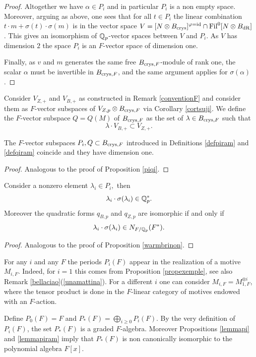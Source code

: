 \begin{proof}
 Altogether we have    $\alpha \in P_i$ and in particular  $P_i$ is a non empty space. Moreover, arguing as above, one sees that for all $t \in P_i$ the linear combination $t \cdot m + \sigma(t) \cdot \sigma (m)$  is in the vector space $V=[N \otimes B_{\textnormal{crys}}]^{\varphi=\mathrm{id}} \cap  \textnormal{Fil}^0[N \otimes B_{\mathrm{dR}}] $. This gives an isomorphism of $\mathbb{Q}_p$-vector spaces between $V$ and $P_i$. As $V$ has dimension $2$ the space $P_i$ is an $F$-vector space of dimension one.

 Finally, as $v$ and $m$ generates the same free  $B_{\textnormal{crys},F}$-module of rank one, the scalar $\alpha$ must be invertible in $B_{\textnormal{crys},F}$, and the same argument applies for $ \sigma(\alpha)$.
\end{proof}

\begin{definition}
\notready\label{defqiram}
Consider $V_{Z,+}$ and $V_{B,+}$ as constructed in Remark \ref{conventionF} and consider them as $F$-vector subspaces of $V_{Z,p}\otimes B_{\textnormal{crys},F}$ via Corollary \ref{cortsuji}.
We define the $F$-vector subspace $Q=Q(M)$ of $B_{\textnormal{crys},F}$ as the set of $\lambda \in B_{\textnormal{crys},F}$ such that
\[\lambda \cdot V_{B,+} \subset V_{Z,+}.\]
\end{definition}
\begin{proposition}
\notready\label{piqiram}
The $F$-vector subspaces $P_i,Q\subset B_{\textnormal{crys},F}$ introduced in Definitions \ref{defpiram} and \ref{defqiram} coincide and they have dimension one.
\end{proposition}
\begin{proof}
Analogous to the proof of Proposition \ref{piqi}.
\end{proof}


\begin{prop}
\notready\label{warmbrinonram}
Consider a nonzero element $\lambda_i \in P_i,$ then \[\lambda_i \cdot\sigma(\lambda_i) \in \mathbb{Q}^*_p.\] Moreover the quadratic forms $q_{B,p}$ and $q_{Z,p}$ are isomorphic if and only if
 \[\lambda_i \cdot\sigma(\lambda_i) \in N_{F/\mathbb{Q}_p}(F^*).\]
\end{prop}
\begin{proof}
Analogous to the proof of Proposition \ref{warmbrinon}.
\end{proof}
\begin{remark}
\notready
For any $i$ and any $F$ the periods $P_i(F)$ appear in the realization of a motive $M_{i,F}$. Indeed, for $i=1$ this comes from
Proposition \ref{propexemple}, see also Remark \ref{bellaciao}(\ref{unamattina}). For a different $i$ one can consider $M_{i,F}=M_{1,F}^{\otimes i}$, where the tensor product is done in the $F$-linear category of motives endowed with an $F$-action.

Define $P_0(F)=F$ and $P_*(F)=\bigoplus_{i\geq 0} P_i(F)$. By the very definition of $P_i(F)$, the set $P_*(F)$ is a graded $F$-algebra. Moreover Propositions \ref{lemmapi} and \ref{lemmapiram} imply that $P_*(F)$  is non canonically isomorphic to the polynomial algebra $F[x]$.

\end{remark}
